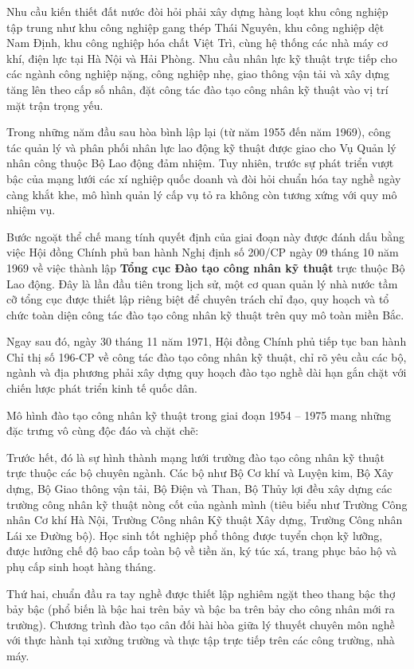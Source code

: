 Nhu cầu kiến thiết đất nước đòi hỏi phải xây dựng hàng loạt khu công nghiệp tập trung như khu công nghiệp gang thép Thái Nguyên, khu công nghiệp dệt Nam Định, khu công nghiệp hóa chất Việt Trì, cùng hệ thống các nhà máy cơ khí, điện lực tại Hà Nội và Hải Phòng. Nhu cầu nhân lực kỹ thuật trực tiếp cho các ngành công nghiệp nặng, công nghiệp nhẹ, giao thông vận tải và xây dựng tăng lên theo cấp số nhân, đặt công tác đào tạo công nhân kỹ thuật vào vị trí mặt trận trọng yếu.

Trong những năm đầu sau hòa bình lập lại (từ năm 1955 đến năm 1969), công tác quản lý và phân phối nhân lực lao động kỹ thuật được giao cho Vụ Quản lý nhân công thuộc Bộ Lao động đảm nhiệm. Tuy nhiên, trước sự phát triển vượt bậc của mạng lưới các xí nghiệp quốc doanh và đòi hỏi chuẩn hóa tay nghề ngày càng khắt khe, mô hình quản lý cấp vụ tỏ ra không còn tương xứng với quy mô nhiệm vụ.

Bước ngoặt thể chế mang tính quyết định của giai đoạn này được đánh dấu bằng việc Hội đồng Chính phủ ban hành Nghị định số 200/CP ngày 09 tháng 10 năm 1969 về việc thành lập \textbf{Tổng cục Đào tạo công nhân kỹ thuật} trực thuộc Bộ Lao động. Đây là lần đầu tiên trong lịch sử, một cơ quan quản lý nhà nước tầm cỡ tổng cục được thiết lập riêng biệt để chuyên trách chỉ đạo, quy hoạch và tổ chức toàn diện công tác đào tạo công nhân kỹ thuật trên quy mô toàn miền Bắc. 

Ngay sau đó, ngày 30 tháng 11 năm 1971, Hội đồng Chính phủ tiếp tục ban hành Chỉ thị số 196-CP về công tác đào tạo công nhân kỹ thuật, chỉ rõ yêu cầu các bộ, ngành và địa phương phải xây dựng quy hoạch đào tạo nghề dài hạn gắn chặt với chiến lược phát triển kinh tế quốc dân.

Mô hình đào tạo công nhân kỹ thuật trong giai đoạn 1954 -- 1975 mang những đặc trưng vô cùng độc đáo và chặt chẽ:

Trước hết, đó là sự hình thành mạng lưới trường đào tạo công nhân kỹ thuật trực thuộc các bộ chuyên ngành. Các bộ như Bộ Cơ khí và Luyện kim, Bộ Xây dựng, Bộ Giao thông vận tải, Bộ Điện và Than, Bộ Thủy lợi đều xây dựng các trường công nhân kỹ thuật nòng cốt của ngành mình (tiêu biểu như Trường Công nhân Cơ khí Hà Nội, Trường Công nhân Kỹ thuật Xây dựng, Trường Công nhân Lái xe Đường bộ). Học sinh tốt nghiệp phổ thông được tuyển chọn kỹ lưỡng, được hưởng chế độ bao cấp toàn bộ về tiền ăn, ký túc xá, trang phục bảo hộ và phụ cấp sinh hoạt hàng tháng.

Thứ hai, chuẩn đầu ra tay nghề được thiết lập nghiêm ngặt theo thang bậc thợ bảy bậc (phổ biến là bậc hai trên bảy và bậc ba trên bảy cho công nhân mới ra trường). Chương trình đào tạo cân đối hài hòa giữa lý thuyết chuyên môn nghề với thực hành tại xưởng trường và thực tập trực tiếp trên các công trường, nhà máy.

